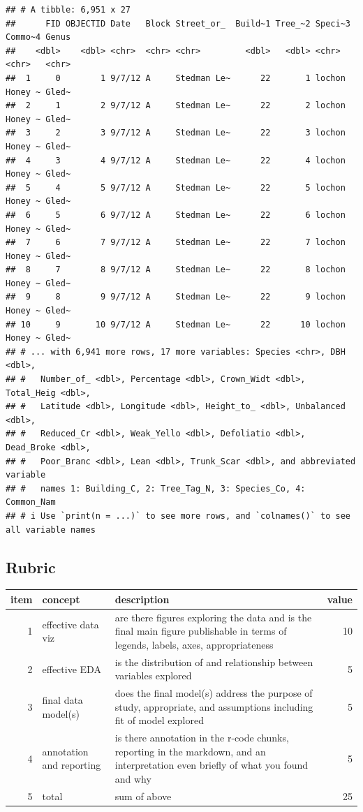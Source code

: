 \documentclass[
]{book}
\begin{document}
\begin{verbatim}
## # A tibble: 6,951 x 27
##      FID OBJECTID Date   Block Street_or_  Build~1 Tree_~2 Speci~3 Commo~4 Genus
##    <dbl>    <dbl> <chr>  <chr> <chr>         <dbl>   <dbl> <chr>   <chr>   <chr>
##  1     0        1 9/7/12 A     Stedman Le~      22       1 lochon  Honey ~ Gled~
##  2     1        2 9/7/12 A     Stedman Le~      22       2 lochon  Honey ~ Gled~
##  3     2        3 9/7/12 A     Stedman Le~      22       3 lochon  Honey ~ Gled~
##  4     3        4 9/7/12 A     Stedman Le~      22       4 lochon  Honey ~ Gled~
##  5     4        5 9/7/12 A     Stedman Le~      22       5 lochon  Honey ~ Gled~
##  6     5        6 9/7/12 A     Stedman Le~      22       6 lochon  Honey ~ Gled~
##  7     6        7 9/7/12 A     Stedman Le~      22       7 lochon  Honey ~ Gled~
##  8     7        8 9/7/12 A     Stedman Le~      22       8 lochon  Honey ~ Gled~
##  9     8        9 9/7/12 A     Stedman Le~      22       9 lochon  Honey ~ Gled~
## 10     9       10 9/7/12 A     Stedman Le~      22      10 lochon  Honey ~ Gled~
## # ... with 6,941 more rows, 17 more variables: Species <chr>, DBH <dbl>,
## #   Number_of_ <dbl>, Percentage <dbl>, Crown_Widt <dbl>, Total_Heig <dbl>,
## #   Latitude <dbl>, Longitude <dbl>, Height_to_ <dbl>, Unbalanced <dbl>,
## #   Reduced_Cr <dbl>, Weak_Yello <dbl>, Defoliatio <dbl>, Dead_Broke <dbl>,
## #   Poor_Branc <dbl>, Lean <dbl>, Trunk_Scar <dbl>, and abbreviated variable
## #   names 1: Building_C, 2: Tree_Tag_N, 3: Species_Co, 4: Common_Nam
## # i Use `print(n = ...)` to see more rows, and `colnames()` to see all variable names
\end{verbatim}

\hypertarget{rubric-1}{%
\subsection*{Rubric}\label{rubric-1}}

\begin{tabular}{rllr}
\toprule
item & concept & description & value\\
\midrule
1 & effective data viz & are there figures exploring the data and is the final main figure publishable in terms of legends, labels, axes, appropriateness & 10\\
2 & effective EDA & is the distribution of and relationship between variables explored & 5\\
3 & final data model(s) & does the final model(s) address the purpose of study, appropriate, and assumptions including  fit of model explored & 5\\
4 & annotation and reporting & is there annotation in the r-code chunks, reporting in the markdown, and an interpretation even briefly of what you found and why & 5\\
5 & total & sum of above & 25\\
\bottomrule
\end{tabular}

  
\end{document}
